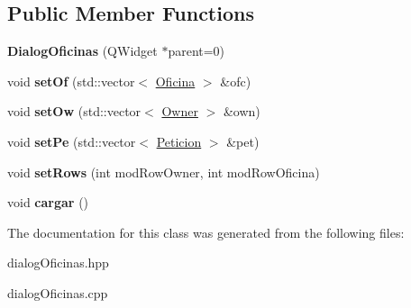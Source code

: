 \subsection*{Public Member Functions}
\begin{DoxyCompactItemize}
\item 
\hypertarget{classDialogOficinas_ad6a35128c2eb7c8f3e38db464d451142}{}{\bfseries Dialog\+Oficinas} (Q\+Widget $\ast$parent=0)\label{classDialogOficinas_ad6a35128c2eb7c8f3e38db464d451142}

\item 
\hypertarget{classDialogOficinas_a848379b90b4b090dda20f398eb2aecaf}{}void {\bfseries set\+Of} (std\+::vector$<$ \hyperlink{classOficina}{Oficina} $>$ \&ofc)\label{classDialogOficinas_a848379b90b4b090dda20f398eb2aecaf}

\item 
\hypertarget{classDialogOficinas_a0bbcb3a5ad14e2886ec3db535c9f7c86}{}void {\bfseries set\+Ow} (std\+::vector$<$ \hyperlink{classOwner}{Owner} $>$ \&own)\label{classDialogOficinas_a0bbcb3a5ad14e2886ec3db535c9f7c86}

\item 
\hypertarget{classDialogOficinas_a35c31c78feea1e2f73fc01ad3c90c09d}{}void {\bfseries set\+Pe} (std\+::vector$<$ \hyperlink{classPeticion}{Peticion} $>$ \&pet)\label{classDialogOficinas_a35c31c78feea1e2f73fc01ad3c90c09d}

\item 
\hypertarget{classDialogOficinas_a640b675822fb98a9fe2e20fb4f5043c7}{}void {\bfseries set\+Rows} (int mod\+Row\+Owner, int mod\+Row\+Oficina)\label{classDialogOficinas_a640b675822fb98a9fe2e20fb4f5043c7}

\item 
\hypertarget{classDialogOficinas_a8d83fdb7fc51dca3676b0d7f0ade6144}{}void {\bfseries cargar} ()\label{classDialogOficinas_a8d83fdb7fc51dca3676b0d7f0ade6144}

\end{DoxyCompactItemize}


The documentation for this class was generated from the following files\+:\begin{DoxyCompactItemize}
\item 
dialog\+Oficinas.\+hpp\item 
dialog\+Oficinas.\+cpp\end{DoxyCompactItemize}
